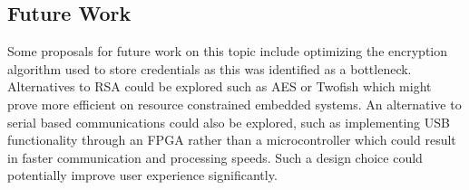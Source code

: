 \subsection{Future Work}
Some proposals for future work on this topic include optimizing the encryption algorithm used to store credentials as this was identified as a bottleneck. Alternatives to RSA could be explored such as AES or Twofish which might prove more efficient on resource constrained embedded systems. An alternative to serial based communications could also be explored, such as implementing USB functionality through an FPGA rather than a microcontroller which could result in faster communication and processing speeds. Such a design choice could potentially improve user experience significantly. 

